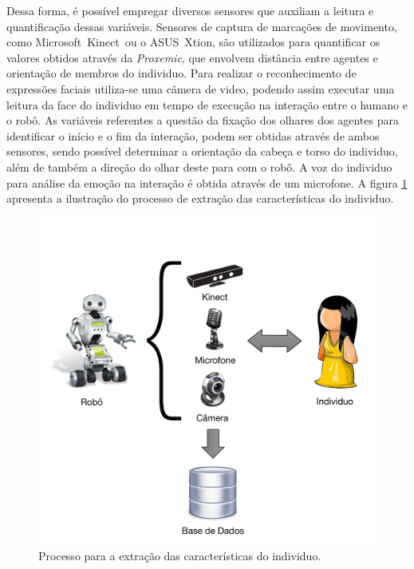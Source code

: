 Dessa forma, é possível empregar diversos sensores que auxiliam a leitura e quantificação dessas variáveis. Sensores de captura de marcações de movimento, como Microsoft\textregistered\ Kinect\textregistered\ ou o ASUS\textregistered\ Xtion\textregistered, são utilizados para quantificar os valores obtidos através da \emph{Proxemic}, que envolvem distância entre agentes e orientação de membros do individuo. Para realizar o reconhecimento de expressões faciais utiliza-se uma câmera de video, podendo assim executar uma leitura da face do individuo em tempo de execução na interação entre o humano e o robô. As variáveis referentes a questão da fixação dos olhares dos agentes para identificar o início e o fim da interação, podem ser obtidas através de ambos sensores, sendo possível determinar a orientação da cabeça e torso do individuo, além de também a direção do olhar deste para com o robô. A voz do individuo para análise da emoção na interação é obtida através de um microfone. A figura \ref{fig:capturacaracteristicas} apresenta a ilustração do processo de extração das características do individuo.

\begin{figure}[ht!]
	\centering
	\includegraphics[scale=0.6]{images/captura_carac_individuo.png}
	\caption{Processo para a extração das características do individuo.}
	\label{fig:capturacaracteristicas}
\end{figure}

